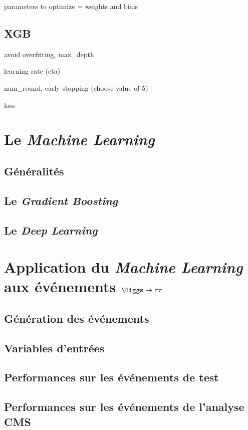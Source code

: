 parameters to optimize = weights and biais



\subsection*{XGB}
avoid overfitting, max\_depth

learning rate (eta)

num\_round, early stopping (choose value of 5)

loss



\section{Le \emph{Machine Learning}}
\subsection{Généralités}
\subsection{Le \emph{Gradient Boosting}}
\subsection{Le \emph{Deep Learning}}

\section{Application du \emph{Machine Learning} aux événements $\Higgs\to\tau\tau$}
\subsection{Génération des événements}
\subsection{Variables d'entrées}
\subsection{Performances sur les événements de test}
\subsection{Performances sur les événements de l'analyse CMS}

